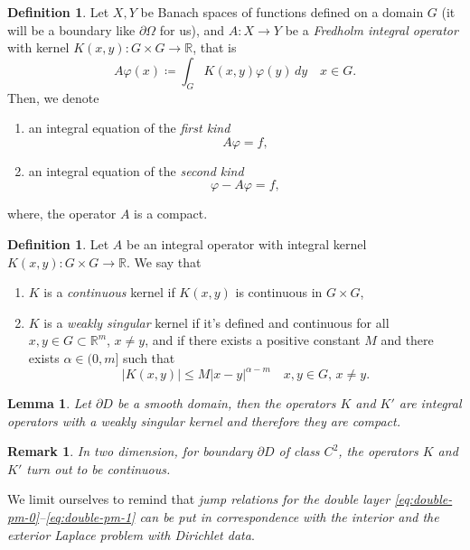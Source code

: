 \documentclass[10pt, a4paper, twoside, openright]{book}
\theoremstyle{definition}
\newtheorem{definition}[subsection]{Definition}
\theoremstyle{plain}
\theoremstyle{plain}
\theoremstyle{plain}
\theoremstyle{plain}
\newtheorem{remark}[subsection]{Remark}
\theoremstyle{plain}
\newtheorem{lemma}[subsection]{Lemma}
\theoremstyle{plain}
\theoremstyle{plain}
\theoremstyle{plain}
\let\phi\varphi
\begin{document}
\begin{definition}
 Let $X,Y$ be Banach spaces of functions defined on a domain $G$ (it will be a boundary like $\partial \Omega$ for us), and $A:X\to Y$ be a \emph{Fredholm integral operator} 
 with kernel $K(x,y):G\times G\to \mathbb{R}$, that is
 \begin{equation}
  A\phi(x)\coloneqq\int_G K(x,y)\phi(y)\,dy\quad x\in G. \label{eq:def-integral-operator}
 \end{equation}
 Then, we denote
 \begin{enumerate}
  \item an integral equation of the \emph{first kind}
   \begin{equation}
    A\phi=f,
   \end{equation}
  \item an integral equation of the \emph{second kind}
   \begin{equation}
    \phi - A\phi=f,
   \end{equation}
 \end{enumerate}
where, the operator $A$ is a compact.
\end{definition}
\begin{definition}
 Let $A$ be an integral operator with integral kernel $K(x,y):G \times G \to\mathbb{R}$. We say that
 \begin{enumerate}
  \item $K$ is a \emph{continuous} kernel if $K(x,y)$ is continuous in $G\times G$,
  \item $K$ is a \emph{weakly singular} kernel if it's defined and continuous for all $x,y\in G\subset \mathbb{R}^m$, $x\neq y$, and if there exists a positive constant $M$ and 
  there exists $\alpha\in (0,m]$ such that
  \begin{equation}
   |K(x,y)|\leq M |x-y|^{\alpha-m}\quad x,y\in G, \, x\neq y.
  \end{equation}
 \end{enumerate}
\end{definition}
\begin{lemma}
\label{lemma:K-K'-compact}
 Let $\partial D$ be a smooth domain, then the operators $K$ and $K'$ are integral operators with a weakly singular kernel and therefore they are compact.
\end{lemma}
\begin{remark}
 In two dimension, for boundary $\partial D$ of class $C^2$, the operators $K$ and $K'$ turn out to be continuous.
\end{remark}
We limit ourselves to remind that \emph{jump relations for the double layer \eqref{eq:double-pm-0}--\eqref{eq:double-pm-1} can be put in correspondence with the interior and the exterior Laplace problem with Dirichlet data}.
\end{document}

